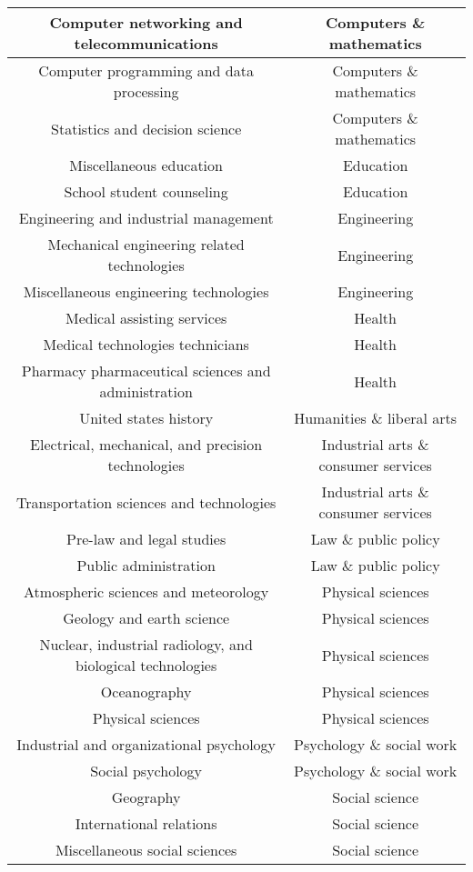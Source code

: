 \documentclass[11pt]{article}
\begin{document}
\begin{center}
\begin{longtable} {|| c c ||}
    \hline
    Computer networking and telecommunications & Computers \& mathematics \\
    \hline
    Computer programming and data processing & Computers \& mathematics \\
    \hline
    Statistics and decision science & Computers \& mathematics \\
    \hline
    Miscellaneous education & Education \\
    \hline
    School student counseling & Education \\
    \hline
    Engineering and industrial management & Engineering \\
    \hline
    Mechanical engineering related technologies & Engineering \\
    \hline
    Miscellaneous engineering technologies & Engineering \\
    \hline
    Medical assisting services & Health \\
    \hline
    Medical technologies technicians & Health \\
    \hline
    Pharmacy pharmaceutical sciences and administration & Health \\
    \hline
    United states history & Humanities \& liberal arts \\
    \hline
    Electrical, mechanical, and precision technologies & Industrial arts \& consumer services \\
    \hline
    Transportation sciences and technologies & Industrial arts \& consumer services \\
    \hline
    Pre-law and legal studies & Law \& public policy \\
    \hline
    Public administration & Law \& public policy \\
    \hline
    Atmospheric sciences and meteorology & Physical sciences \\
    \hline
    Geology and earth science & Physical sciences \\
    \hline
    Nuclear, industrial radiology, and biological technologies & Physical sciences \\
    \hline
    Oceanography & Physical sciences \\
    \hline
    Physical sciences & Physical sciences \\
    \hline
    Industrial and organizational psychology & Psychology \& social work \\
    \hline
    Social psychology & Psychology \& social work \\
    \hline
    Geography & Social science \\
    \hline
    International relations & Social science \\
    \hline
    Miscellaneous social sciences & Social science \\
    \hline
\end {longtable}
\label{fig:nine}
\end{center}
\end{document}
